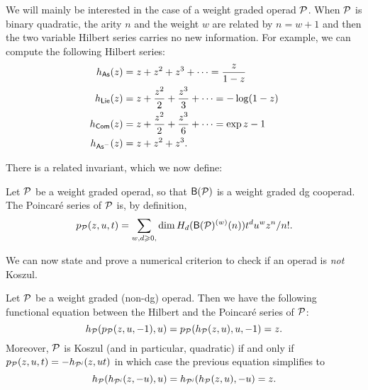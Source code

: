 We will mainly be interested in the case of a weight graded operad ${\mathcal{P}}$.
When ${\mathcal{P}}$ is binary quadratic, the arity $n$ and the weight $w$ are related
by $n = w+1$ and then the two variable Hilbert series carries no new information.
For example, we can compute the following Hilbert series:
\begin{align*}
h_{\mathsf{As}}(z) &=  z + z^2 + z^3 + \cdots = \frac{z}{1-z} \\
h_{\mathsf{Lie}}(z) &=  z + \frac {z^2}2 + \frac{z^3} 3 + \cdots =-\log(1-z) \\
h_{\mathsf{Com}}(z) &=  z + \frac {z^2}2 + \frac{z^3} 6  + \cdots = \exp z -1 \\
h_{\mathsf{As}^-}(z) &=  z +  {z^2} + z^3.
\end{align*}


There is a related invariant, which we now define:
\begin{definition} Let ${\mathcal{P}}$ be a weight graded operad, so that
$\mathsf{B}({\mathcal{P}})$ is a weight graded dg cooperad. The Poincar\'e series
of ${\mathcal{P}}$ is, by definition,
\[
p_{{\mathcal{P}}}(z,u,t) = \sum_{w,d\geqslant 0,} \dim H_d(\mathsf{B}({\mathcal{P}})^{(w)}(n)) t^d u^w z^n/n!.
\]
\end{definition}

We can now state and prove a numerical criterion to check if an
operad is \emph{not} Koszul.

\begin{theorem}
Let ${\mathcal{P}}$ be a weight graded (non-dg) operad. Then we have the following
functional equation between the Hilbert and the Poincar\'e series of ${\mathcal{P}}$:
\[
h_{\mathcal{P}}( p_{\mathcal{P}}(z,u,-1),u) = p_{\mathcal{P}}(h_{\mathcal{P}}(z,u),u,-1) = z. \]
Moreover, ${\mathcal{P}}$ is Koszul (and in particular, quadratic) if and only
if $p_\PP(z,u,t) = -h_{\PP^\eantishriek}(z,ut)$ in which case the previous
equation simplifies to
\[
h_\PP( h_{\PP^\eantishriek}(z,-u),u) = h_{\PP^\eantishriek}(h_\PP(z,u),-u) = z. 
\]
\end{theorem}

